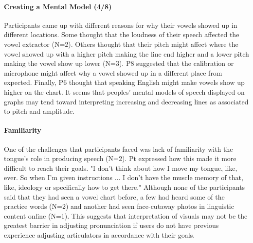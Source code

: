 \paragraph{Creating a Mental Model (4/8)}
Participants came up with different reasons for why their vowels showed up in different locations. Some thought that the loudness of their speech affected the vowel extractor (N=2). Others thought that their pitch might affect where the vowel showed up with a higher pitch making the line end higher and a lower pitch making the vowel show up lower (N=3). P8 suggested that the calibration or microphone might affect why a vowel showed up in a different place from expected. Finally, P6 thought that speaking English might make vowels show up higher on the chart. It seems that peoples' mental models of speech displayed on graphs may tend toward interpreting increasing and decreasing lines as associated to pitch and amplitude. 

\paragraph{Familiarity}
One of the challenges that participants faced was lack of familiarity with the tongue's role in producing speech (N=2). Pt expressed how this made it more difficult to reach their goals. "I don't think about how I move my tongue, like, ever. So when I'm given instructions ... I don't have the muscle memory of that, like, ideology or specifically how to get there." Although none of the participants said that they had seen a vowel chart before, a few had heard some of the practice words (N=2) and another had seen face-cutaway photos in linguistic content online (N=1). This suggests that interpretation of visuals may not be the greatest barrier in adjusting pronunciation if users do not have previous experience adjusting articulators in accordance with their goals.

